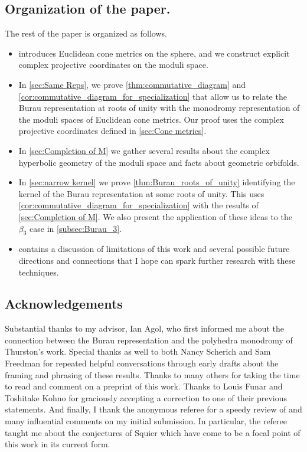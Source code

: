 \documentclass{amsart}
\begin{document}
    \subsection*{Organization of the paper.} The rest of the paper is organized as follows.
    \begin{itemize}
        \item {} introduces Euclidean cone metrics on the sphere, and we construct explicit complex projective coordinates on the moduli space.
        \item In \cref{sec:Same Reps}, we prove \cref{thm:commutative_diagram} and \cref{cor:commutative_diagram_for_specialization} that allow us to relate the Burau representation at roots of unity with the monodromy representation of the moduli spaces of Euclidean cone metrics. Our proof uses the complex projective coordinates defined in \cref{sec:Cone metrics}.
        \item In \cref{sec:Completion of M} we gather several results about the complex hyperbolic geometry of the moduli space and facts about geometric orbifolds.
        \item In \cref{sec:narrow kernel} we prove \cref{thm:Burau_roots_of_unity} identifying the kernel of the Burau representation at some roots of unity. This uses \cref{cor:commutative_diagram_for_specialization} with the results of \cref{sec:Completion of M}. We also present the application of these ideas to the $\beta_3$ case in \cref{subsec:Burau_3}.
        \item {} contains a discussion of limitations of this work and several possible future directions and connections that I hope can spark further research with these techniques.
    \end{itemize}
    
    \subsection*{Acknowledgements} Substantial thanks to my advisor, Ian Agol, who first informed me about the connection between the Burau representation and the polyhedra monodromy of Thurston's work. Special thanks as well to both Nancy Scherich and Sam Freedman for repeated helpful conversations through early drafts about the framing and phrasing of these results. Thanks to many others for taking the time to read and comment on a preprint of this work. Thanks to Louis Funar and Toshitake Kohno for graciously accepting a correction to one of their previous statements. And finally, I thank the anonymous referee for a speedy review of and many influential comments on my initial submission. In particular, the referee taught me about the conjectures of Squier which have come to be a focal point of this work in its current form.
\end{document}
